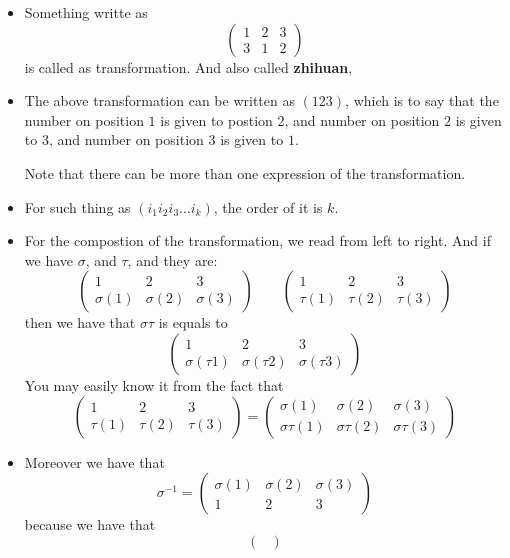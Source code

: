 \documentclass[../main.tex]{subfiles}
\begin{document}
\begin{itemize}
\item Something writte as
\[
	\begin{pmatrix}
		1 & 2 & 3 \\ 
		3 & 1 & 2 
	\end{pmatrix}
\]
is called as transformation. And also called \textbf{zhihuan}, 
\item The above transformation can be written as \( (123)\), which is to say that the number on position \(1\) is given 
	to postion \(2\), and number on position \(2\) is given to \(3\), and number on position 3 is given to \(1\).
	
	Note that there can be more than one expression of the transformation.
\item For such thing as \( ( i_{1}  i_{2} i _{3} \dots i _{k})\), the order of it is \(k\).
\item For the compostion of the transformation, we read from left to right. 
	And if we have \(\sigma\), and \(\tau\), and they are: 
\[
\begin{pmatrix}
 1 & 2 & 3\\
	\sigma (1) & \sigma (2) & \sigma (3)
\end{pmatrix}
\qquad 
\begin{pmatrix}
	1 & 2 & 3 \\ 
	\tau (1)  & \tau (2 ) &\tau (3)
\end{pmatrix}
\]
then we have that 
\(\sigma\tau\) is equals to 
\[
\begin{pmatrix}
	1 & 2 & 3 \\ 
	\sigma (\tau 1) &\sigma (\tau 2) &\sigma (\tau 3)
\end{pmatrix}
\]
You may easily know it from the fact that 
\[
\begin{pmatrix}
1 & 2 & 3 \\
\tau (1) &\tau (2) &\tau (3)
\end{pmatrix}
= 
\begin{pmatrix}
\sigma (1) &\sigma (2) &\sigma (3) \\ 
\sigma\tau (1) &\sigma\tau (2) &\sigma\tau (3)
\end{pmatrix}
\]
\item 	
Moreover we have that 
\[
\sigma ^{-1} = 
\begin{pmatrix}
	\sigma (1) &\sigma (2) &\sigma (3) \\ 
	1 & 2 & 3 
\end{pmatrix} 
\]
because we have that 
\[
\begin{pmatrix}

\end{pmatrix}\]
\end{itemize}
\end{document}
